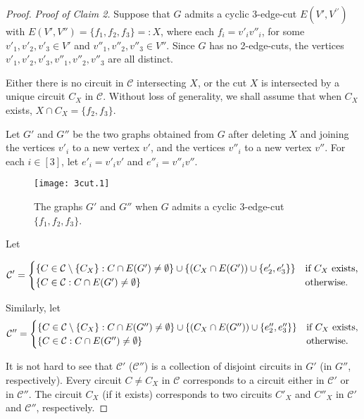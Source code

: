 \documentclass[]{theclass}
\begin{document}
\begin{proof}
\noindent\emph{Proof of Claim 2.} Suppose that $G$ admits a cyclic 3-edge-cut $E(V',V^{\prime\prime})$ with $E(V',V'')=\{f_{1}, f_{2}, f_{3}\}=:X$, where each $f_{i}=v'_{i}v''_{i}$, for some $v'_{1},v'_{2},v'_{3}\in V'$ and $ v''_{1},v''_{2}, v''_{3} \in V''$. Since $G$ has no 2-edge-cuts, the vertices $v'_{1},v'_{2},v'_{3},  v''_{1},v''_{2}, v''_{3}$ are all  distinct.

Either there is no circuit in $\mathcal{C}$ intersecting $X$, or the cut $X$ is intersected by a unique circuit $C_X$ in $\mathcal{C}$. Without loss of generality, we shall assume that when $C_X$ exists, $X\cap C_X=\{f_{2},f_3\}$.

Let $G'$ and $G''$ be the two graphs obtained from $G$ after deleting $X$ and joining the vertices $v'_{i}$ to a new vertex $v'$, and the vertices $v''_{i}$ to a new vertex $v''$. For each $i\in[3]$, let $e'_{i}=v'_{i}v'$ and $e''_{i}=v''_{i}v''$. 

\begin{figure}[ht]
      \centering
      \texttt{[image: 3cut.1]}
      \caption{The graphs $G'$ and $G''$ when $G$ admits a cyclic 3-edge-cut $\{f_1,f_2,f_3\}$.}
      \label{figure 3cut}
\end{figure}

Let

\[\mathcal{C}' =
  \begin{cases}
  \{C\in \mathcal{C}\setminus \{C_X\} : C\cap E(G')\ne \emptyset\} \cup \{(C_X\cap E(G'))\cup\{e'_2,e'_3\}\}& $if $C_X$ exists,$\\
  \{C\in \mathcal{C} : C\cap E(G')\ne \emptyset\}  & $otherwise.$
  \end{cases}\]

Similarly, let
\[\mathcal{C}'' =
  \begin{cases}
  \{C\in \mathcal{C}\setminus \{C_X\} : C\cap E(G'')\ne \emptyset\} \cup \{(C_X\cap E(G''))\cup\{e''_2,e''_3\}\}& $if $C_X$ exists,$\\
  \{C\in \mathcal{C} : C\cap E(G'')\ne \emptyset\}  & $otherwise.$
  \end{cases}\]

It is not hard to see that $\mathcal{C}'$ ($\mathcal{C}''$) is a collection of disjoint circuits in $G'$ (in $G''$, respectively). Every circuit $C\ne C_X$ in $\mathcal{C}$ corresponds to a circuit either in $\mathcal{C}'$ or in $\mathcal{C}''$. The circuit $C_X$ (if it exists) corresponds to two circuits $C'_X$ and $C''_X$ in $\mathcal{C}'$ and $\mathcal{C}''$, respectively.


\end{proof}
\end{document}
